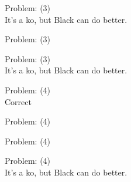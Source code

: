 \documentclass[11pt]{article}
\begin{document}
\begin{minipage}[t]{0.5\textwidth}
  {\centering
  
  Problem: (3)\\
  It's a ko, but Black can do better.\\
  }
\end{minipage}
\begin{minipage}[t]{0.5\textwidth}
  {\centering
  
  Problem: (3)\\
  
  }
\end{minipage}
\begin{minipage}[t]{0.5\textwidth}
  {\centering
  
  Problem: (3)\\
  It's a ko, but Black can do better.\\
  }
\end{minipage}
\begin{minipage}[t]{0.5\textwidth}
  {\centering
  
  Problem: (4)\\
  Correct\\
  }
\end{minipage}
\begin{minipage}[t]{0.5\textwidth}
  {\centering
  
  Problem: (4)\\
  
  }
\end{minipage}
\begin{minipage}[t]{0.5\textwidth}
  {\centering
  
  Problem: (4)\\
  
  }
\end{minipage}
\begin{minipage}[t]{0.5\textwidth}
  {\centering
  
  Problem: (4)\\
  It's a ko, but Black can do better.\\
  }
\end{minipage}
\end{document}
